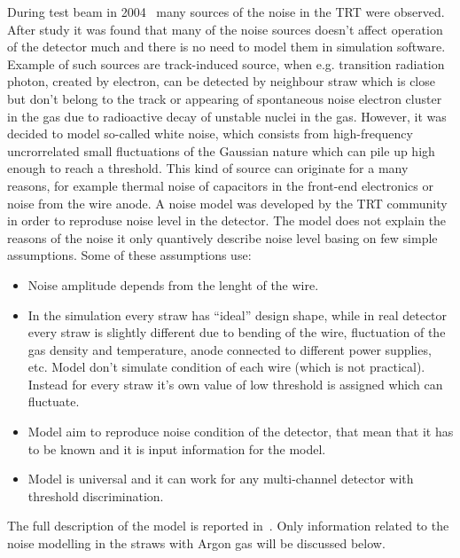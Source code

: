During test beam in 2004~\cite{trt_test_beam} many sources of the noise in the TRT were observed.
After study it was found that many of the noise sources doesn't affect operation of the detector much and there is no need to model them in simulation software.
Example of such sources are track-induced source, when e.g. transition radiation photon, created by electron, can be detected by neighbour straw which is close 
but don't belong to the track or appearing of spontaneous noise electron cluster in the gas due to radioactive decay of unstable nuclei in the gas.
However, it was decided to model so-called white noise, which consists from high-frequency uncrorrelated small fluctuations of the Gaussian nature which 
can pile up high enough to reach a threshold. This kind of source can originate for a many reasons, for example thermal noise of capacitors in the front-end electronics
or noise from the wire anode. A noise model was developed by the TRT community in order to reproduse noise level in the detector.
The model does not explain the reasons of the noise it only quantively describe noise level basing on few simple assumptions.
Some of these assumptions use:
\begin{itemize}
 \item Noise amplitude depends from the lenght of the wire.
 \item In the simulation every straw has ``ideal'' design shape, while in real detector every straw is slightly different due to bending of the wire, 
 fluctuation of the gas  density and temperature, anode connected to different power supplies, etc. Model don't simulate condition of each wire 
 (which is not practical). 
 Instead for every straw it's own value of low threshold is assigned which can fluctuate.
 \item Model aim to reproduce noise condition of the detector, that mean that it has to be known and it is input information for the model.
 \item Model is universal and it can work for any multi-channel detector with threshold discrimination.
\end{itemize}
The full description of the model is reported in~\cite{kittelmann_thesis}. 
Only information related to the noise modelling in the straws with Argon gas will be discussed below.


